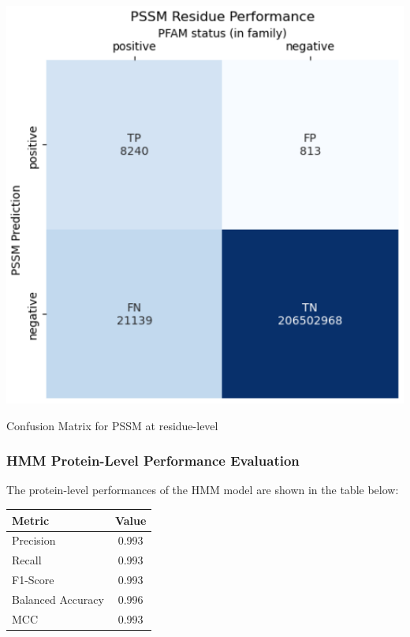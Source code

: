 \documentclass[10pt,twocolumn,letterpaper]{article}
\begin{document}
\begin{center}
    \includegraphics[scale=0.45]{report/img/pssm_res_performance.png}
\end{center}

\begin{center}
    \small{Confusion Matrix for PSSM at residue-level}
\end{center}

\subsubsection{HMM Protein-Level Performance Evaluation}


The protein-level performances of the HMM model are shown in the table below:

\begin{center}
    \begin{tabular}{lc}
        \toprule
        Metric & Value \\
        \midrule
        Precision & 0.993 \\
        Recall & 0.993 \\
        F1-Score & 0.993 \\
        Balanced Accuracy & 0.996 \\
        MCC & 0.993 \\
        \bottomrule
    \end{tabular}
\end{center} \\
\end{document}
